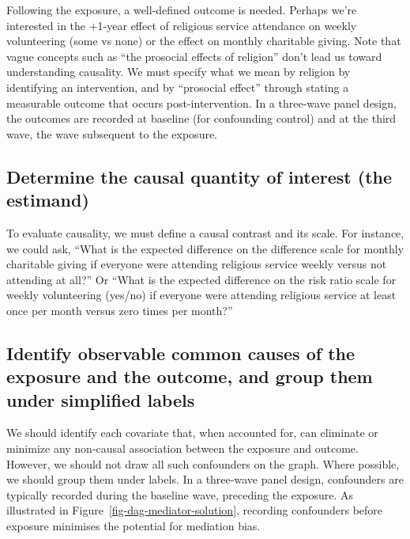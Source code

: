 \documentclass[
  singlecolumn]{report}
\begin{document}
Following the exposure, a well-defined outcome is needed. Perhaps we're
interested in the +1-year effect of religious service attendance on
weekly volunteering (some vs none) or the effect on monthly charitable
giving. Note that vague concepts such as ``the prosocial effects of
religion'' don't lead us toward understanding causality. We must specify
what we mean by religion by identifying an intervention, and by
``prosocial effect'' through stating a measurable outcome that occurs
post-intervention. In a three-wave panel design, the outcomes are
recorded at baseline (for confounding control) and at the third wave,
the wave subsequent to the exposure.

\hypertarget{determine-the-causal-quantity-of-interest-the-estimand}{%
\subsection{\texorpdfstring{\textbf{Determine the causal quantity of
interest (the
estimand)}}{Determine the causal quantity of interest (the estimand)}}\label{determine-the-causal-quantity-of-interest-the-estimand}}

To evaluate causality, we must define a causal contrast and its scale.
For instance, we could ask, ``What is the expected difference on the
difference scale for monthly charitable giving if everyone were
attending religious service weekly versus not attending at all?'' Or
``What is the expected difference on the risk ratio scale for weekly
volunteering (yes/no) if everyone were attending religious service at
least once per month versus zero times per month?''

\hypertarget{identify-observable-common-causes-of-the-exposure-and-the-outcome-and-group-them-under-simplified-labels}{%
\subsection{\texorpdfstring{\textbf{Identify observable common causes of
the exposure and the outcome, and group them under simplified
labels}}{Identify observable common causes of the exposure and the outcome, and group them under simplified labels}}\label{identify-observable-common-causes-of-the-exposure-and-the-outcome-and-group-them-under-simplified-labels}}

We should identify each covariate that, when accounted for, can
eliminate or minimize any non-causal association between the exposure
and outcome. However, we should not draw all such confounders on the
graph. Where possible, we should group them under labels. In a
three-wave panel design, confounders are typically recorded during the
baseline wave, preceding the exposure. As illustrated in
Figure~\ref{fig-dag-mediator-solution}, recording confounders before
exposure minimises the potential for mediation bias.
\end{document}
